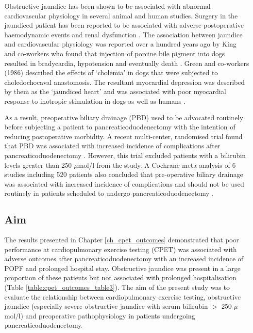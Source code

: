 Obstructive jaundice has been shown to be associated with abnormal cardiovascular physiology in several animal and human studies. 
Surgery in the jaundiced patient has been reported to be associated with adverse postoperative haemodynamic events and renal dysfunction \parencite{pain_perioperative_1985,green_systemic_1995}. 
The association between jaundice and cardiovascular physiology was reported over a hundred years ago by King and co-workers who found that injection of porcine bile pigment into dogs resulted in bradycardia, hypotension and eventually death \parencite{king_effect_1909}. 
Green and co-workers (1986) described the effects of `cholemia' in dogs that were subjected to choledochocaval anastomosis. 
The resultant myocardial depression was described by them as the `jaundiced heart' \parencite{green_jaundiced_1986} and was associated with poor myocardial response to inotropic stimulation in dogs \parencite{binah_obstructive_1985, bomzon_systemic_1986} as well as humans \parencite{lumlertgul_jaundiced_1991}.

As a result, preoperative biliary drainage (PBD) used to be advocated routinely before subjecting a patient to pancreaticoduodenectomy with the intention of reducing postoperative morbidity. 
A recent multi-center, randomised trial found that PBD was associated with increased incidence of complications after pancreaticoduodenectomy \parencite{van_der_gaag_preoperative_2010}.
However, this trial excluded patients with a bilirubin levels greater than 250 $\mu$mol/l from the study. 
A Cochrane meta-analysis of 6 studies including 520 patients also concluded that pre-operative biliary drainage was associated with increased incidence of complications and should not be used routinely in patients scheduled to undergo pancreaticoduodenectomy \parencite{fang_pre-operative_2012}.

\subsection{Aim}
The results presented in Chapter \ref{ch_cpet_outcomes} demonstrated that poor performance at cardiopulmonary exercise testing (CPET) was associated with adverse outcomes after pancreaticoduodenectomy with an increased incidence of POPF and prolonged hospital stay. 
Obstructive jaundice was present in a large proportion of these patients but not associated with prolonged hospitalisation (Table \ref{table:cpet_outcomes_table3}).
The aim of the present study was to evaluate the relationship between cardiopulmonary exercise testing, obstructive jaundice (especially severe obstructive jaundice with serum bilirubin $>$ 250 $\mu$mol/l) and preoperative pathophysiology in patients undergoing pancreaticoduodenectomy.

